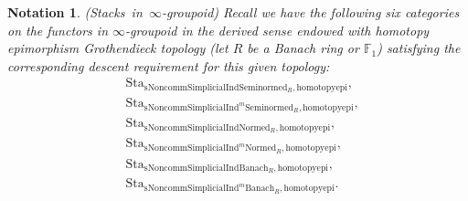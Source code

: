 \documentclass[12pt]{book}
\newtheorem{notation}{Notation}
\begin{document}
\begin{notation}\mbox{\rm{(Stacks in $\infty$-groupoid)}}
Recall we have the following six categories on the functors in $\infty$-groupoid in the derived sense endowed with homotopy epimorphism Grothendieck topology (let $R$ be a Banach ring or $\mathbb{F}_1$) satisfying the corresponding descent requirement for this given topology:
\begin{align}
&\mathrm{Sta}_{\mathrm{sNoncomm}\mathrm{Simplicial}\mathrm{Ind}\mathrm{Seminormed}_R,\mathrm{homotopyepi}},\\
&\mathrm{Sta}_{\mathrm{sNoncomm}\mathrm{Simplicial}\mathrm{Ind}^m\mathrm{Seminormed}_R,\mathrm{homotopyepi}},\\
&\mathrm{Sta}_{\mathrm{sNoncomm}\mathrm{Simplicial}\mathrm{Ind}\mathrm{Normed}_R,\mathrm{homotopyepi}},\\
&\mathrm{Sta}_{\mathrm{sNoncomm}\mathrm{Simplicial}\mathrm{Ind}^m\mathrm{Normed}_R,\mathrm{homotopyepi}},\\
&\mathrm{Sta}_{\mathrm{sNoncomm}\mathrm{Simplicial}\mathrm{Ind}\mathrm{Banach}_R,\mathrm{homotopyepi}},\\
&\mathrm{Sta}_{\mathrm{sNoncomm}\mathrm{Simplicial}\mathrm{Ind}^m\mathrm{Banach}_R,\mathrm{homotopyepi}}.	
\end{align}
	
\end{notation}
\end{document}
